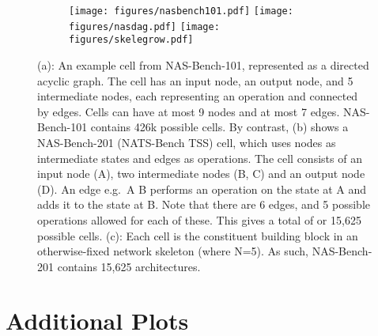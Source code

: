 \documentclass{article}
\begin{document}
\begin{figure}[!h]
        \begin{subfigure}[b]{0.5\textwidth}
        \centering
         \texttt{[image: figures/nasbench101.pdf]}
            \label{fig:nasdag101}
                \texttt{[image: figures/nasdag.pdf]}
                \label{fig:nasdag201}
                \texttt{[image: figures/skelegrow.pdf]}
                \label{fig:skelegrow}
       \end{subfigure}

\caption{(a): An example cell from NAS-Bench-101, represented as a directed acyclic graph. The cell has an input node, an output node, and 5 intermediate nodes, each representing an operation and connected by edges. Cells can have at most 9 nodes and at most 7 edges. NAS-Bench-101 contains 426k possible cells. By contrast, (b) shows a NAS-Bench-201 (NATS-Bench TSS) cell, which uses nodes as intermediate states and edges as operations. The cell consists of an input node (A), two intermediate nodes (B, C) and an output node (D). An edge e.g.\ A B performs an operation on the state at A and adds it to the state at B. Note that there are 6 edges, and 5 possible operations allowed for each of these. This gives a total of  or 15,625 possible cells. (c): Each cell is the constituent building block in an otherwise-fixed network skeleton (where N=5). As such, NAS-Bench-201 contains 15,625 architectures.}
\label{fig:test}
\end{figure}


\clearpage
\onecolumn
\section{Additional Plots}
\label{appendix:plots}
\end{document}
